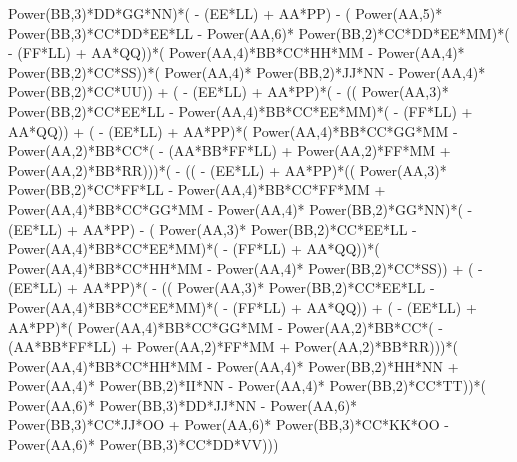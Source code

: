 \documentclass[10pt]{article} %
\begin{document}
{Power(BB,3)*DD*GG*NN)*( - (EE*LL) + AA*PP) - ( Power(AA,5)* Power(BB,3)*CC*DD*EE*LL -  Power(AA,6)* Power(BB,2)*CC*DD*EE*MM)*( - (FF*LL) + AA*QQ))*( Power(AA,4)*BB*CC*HH*MM -  Power(AA,4)* Power(BB,2)*CC*SS))*( Power(AA,4)* Power(BB,2)*JJ*NN -  Power(AA,4)* Power(BB,2)*CC*UU)) + ( - (EE*LL) + AA*PP)*( - (( Power(AA,3)* Power(BB,2)*CC*EE*LL -  Power(AA,4)*BB*CC*EE*MM)*( - (FF*LL) + AA*QQ)) + ( - (EE*LL) + AA*PP)*( Power(AA,4)*BB*CC*GG*MM -  Power(AA,2)*BB*CC*( - (AA*BB*FF*LL) +  Power(AA,2)*FF*MM +  Power(AA,2)*BB*RR)))*( - (( - (EE*LL) + AA*PP)*(( Power(AA,3)* Power(BB,2)*CC*FF*LL -  Power(AA,4)*BB*CC*FF*MM +  Power(AA,4)*BB*CC*GG*MM -  Power(AA,4)* Power(BB,2)*GG*NN)*( - (EE*LL) + AA*PP) - ( Power(AA,3)* Power(BB,2)*CC*EE*LL -  Power(AA,4)*BB*CC*EE*MM)*( - (FF*LL) + AA*QQ))*( Power(AA,4)*BB*CC*HH*MM -  Power(AA,4)* Power(BB,2)*CC*SS)) + ( - (EE*LL) + AA*PP)*( - (( Power(AA,3)* Power(BB,2)*CC*EE*LL -  Power(AA,4)*BB*CC*EE*MM)*( - (FF*LL) + AA*QQ)) + ( - (EE*LL) + AA*PP)*( Power(AA,4)*BB*CC*GG*MM -  Power(AA,2)*BB*CC*( - (AA*BB*FF*LL) +  Power(AA,2)*FF*MM +  Power(AA,2)*BB*RR)))*( Power(AA,4)*BB*CC*HH*MM -  Power(AA,4)* Power(BB,2)*HH*NN +  Power(AA,4)* Power(BB,2)*II*NN -  Power(AA,4)* Power(BB,2)*CC*TT))*( Power(AA,6)* Power(BB,3)*DD*JJ*NN -  Power(AA,6)* Power(BB,3)*CC*JJ*OO +  Power(AA,6)* Power(BB,3)*CC*KK*OO -  Power(AA,6)* Power(BB,3)*CC*DD*VV)))
} \break
\end{document}
